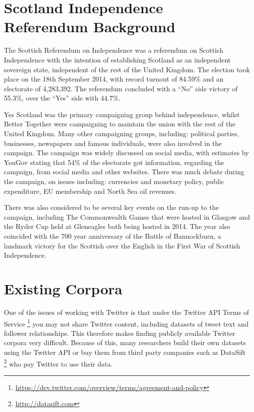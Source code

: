 \documentclass[bsc,frontabs,singlespacing,parskip]{infthesis}     %
\begin{document}
\section{Scotland Independence Referendum Background}
\label{sec:indybackground}
The Scottish Referendum on Independence was a referendum on Scottish Independence with the intention of establishing Scotland as an independent sovereign state, independent of the rest of the United Kingdom. The election took place on the 18th September 2014, with record turnout of 84.59\% and an electorate of 4,283,392. The referendum concluded with a ``No'' side victory of 55.3\%, over the ``Yes'' side with 44.7\%.

Yes Scotland was the primary campaigning group behind independence, whilst Better Together were campaigning to maintain the union with the rest of the United Kingdom. Many other campaigning groups, including: political parties, businesses, newspapers and famous individuals, were also involved in the campaign. The campaign was widely discussed on social media, with estimates by YouGov stating that 54\% of the electorate got information, regarding the campaign, from social media and other websites. There was much debate during the campaign, on issues including: currencies and monetary policy, public expenditure, EU membership and North Sea oil revenues. 

There was also considered to be several key events on the run-up to the campaign, including The Commonwealth Games that were hosted in Glasgow and the Ryder Cup held at Gleneagles both being hosted in 2014. The year also coincided with the 700 year anniversary of the Battle of Bannockburn, a landmark victory for the Scottish over the English in the First War of Scottish Independence. 


\section{Existing Corpora}
One of the issues of working with Twitter is that under the Twitter API Terms of Service \footnote{\url{https://dev.twitter.com/overview/terms/agreement-and-policy}} you may not share Twitter content, including datasets of tweet text and follower relationships. This therefore makes finding publicly available Twitter corpora very difficult. Because of this, many researchers build their own datasets using the Twitter API or buy them from third party companies such as DataSift \footnote{\url{http://datasift.com}} who pay Twitter to use their data.
\end{document}
